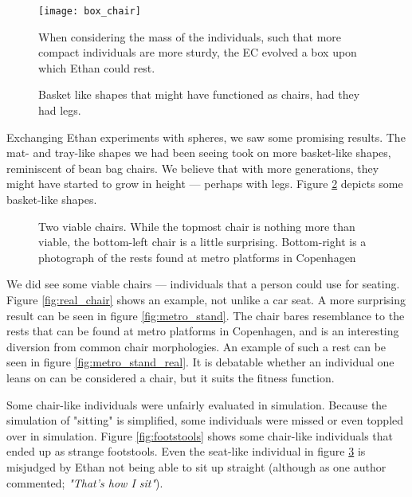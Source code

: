 \begin{figure}[ht]
	\centering
	\texttt{[image: box\_chair]}
	\caption{When considering the mass of the individuals, such that more
	compact individuals are more sturdy, the EC evolved a box upon which
	Ethan could rest.}
	\label{fig:boxchair}
\end{figure}

\begin{figure}[ht]
	\centering
	 \hfil
	\caption{Basket like shapes that might have functioned as chairs, had
	they had legs.}
	\label{fig:baskets}
\end{figure}

Exchanging Ethan experiments with spheres, we saw some promising results. The
mat- and tray-like shapes we had been seeing took on more basket-like shapes,
reminiscent of bean bag chairs. We believe that with more generations, they
might have started to grow in height --- perhaps with legs. Figure
\ref{fig:baskets} depicts some basket-like shapes.

\begin{figure}[ht]
	\centering
	 \hfil
	\caption{Two viable chairs. While the topmost chair is nothing more than
	viable, the bottom-left chair is a little surprising. Bottom-right is a
	photograph of the rests found at metro platforms in Copenhagen}
	\label{fig:viable_chairs}
\end{figure}

We did see some viable chairs --- individuals that a person could use for seating.
Figure \ref{fig:real_chair} shows an example, not unlike a car seat. A more
surprising result can be seen in figure \ref{fig:metro_stand}. The chair bares
resemblance to the rests that can be found at metro platforms in Copenhagen, and
is an interesting diversion from common chair morphologies. An example of such 
a rest can be seen in figure \ref{fig:metro_stand_real}. It is debatable 
whether an individual one leans on can be considered a chair, but it suits the 
fitness function.

Some chair-like individuals were unfairly evaluated in simulation. Because the
simulation of "sitting" is simplified, some individuals were missed or even
toppled over in simulation. Figure \ref{fig:footstools} shows some chair-like
individuals that ended up as strange footstools. Even the seat-like individual
in figure \ref{fig:viable_chairs} is misjudged by Ethan not being able to sit up
straight (although as one author commented; \emph{"That's how I sit"}).

